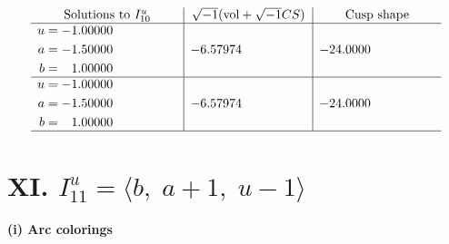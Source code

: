 \documentclass[1p]{elsarticle_modified}
\theoremstyle{definition}
\newcommand{\I}{\sqrt{-1}}
\begin{document}
$$\begin{array}{c|c|c}  
\text{Solutions to }I^u_{10}& \I (\text{vol} + \sqrt{-1}CS) & \text{Cusp shape}\\
 \hline 
\begin{aligned}
u &= -1.00000\phantom{ +0.000000I} \\
a &= -1.50000\phantom{ +0.000000I} \\
b &= \phantom{-}1.00000\phantom{ +0.000000I}\end{aligned}
 & -6.57974\phantom{ +0.000000I} & -24.0000\phantom{ +0.000000I} \\ \hline\begin{aligned}
u &= -1.00000\phantom{ +0.000000I} \\
a &= -1.50000\phantom{ +0.000000I} \\
b &= \phantom{-}1.00000\phantom{ +0.000000I}\end{aligned}
 & -6.57974\phantom{ +0.000000I} & -24.0000\phantom{ +0.000000I}\\
 \hline 
 \end{array}$$\newpage\newpage\renewcommand{\arraystretch}{1}
\centering \section*{XI. $I^u_{11}= \langle b,\;a+1,\;u-1 \rangle$}
\flushleft \textbf{(i) Arc colorings}\\
\end{document}
